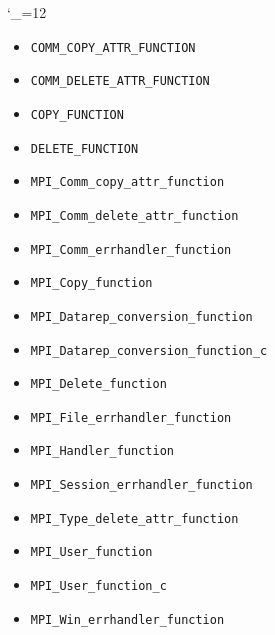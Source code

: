 \begin{multicols}{3}
\catcode`\_=12
\footnotesize
\begin{itemize}
\item \texttt{COMM_COPY_ATTR_FUNCTION}~\pageref{def:COMM_COPY_ATTR_FUNCTION}
\item \texttt{COMM_DELETE_ATTR_FUNCTION}~\pageref{def:COMM_DELETE_ATTR_FUNCTION}
\item \texttt{COPY_FUNCTION}~\pageref{def:COPY_FUNCTION}
\item \texttt{DELETE_FUNCTION}~\pageref{def:DELETE_FUNCTION}
\item \texttt{MPI_Comm_copy_attr_function}~\pageref{def:MPI_Comm_copy_attr_function}
\item \texttt{MPI_Comm_delete_attr_function}~\pageref{def:MPI_Comm_delete_attr_function}
\item \texttt{MPI_Comm_errhandler_function}~\pageref{def:MPI_Comm_errhandler_function}
\item \texttt{MPI_Copy_function}~\pageref{def:MPI_Copy_function}
\item \texttt{MPI_Datarep_conversion_function}~\pageref{def:MPI_Datarep_conversion_function}
\item \texttt{MPI_Datarep_conversion_function_c}~\pageref{def:MPI_Datarep_conversion_function_c}
\item \texttt{MPI_Delete_function}~\pageref{def:MPI_Delete_function}
\item \texttt{MPI_File_errhandler_function}~\pageref{def:MPI_File_errhandler_function}
\item \texttt{MPI_Handler_function}~\pageref{def:MPI_Handler_function}
\item \texttt{MPI_Session_errhandler_function}~\pageref{def:MPI_Session_errhandler_function}
\item \texttt{MPI_Type_delete_attr_function}~\pageref{def:MPI_Type_delete_attr_function}
\item \texttt{MPI_User_function}~\pageref{def:MPI_User_function}
\item \texttt{MPI_User_function_c}~\pageref{def:MPI_User_function_c}
\item \texttt{MPI_Win_errhandler_function}~\pageref{def:MPI_Win_errhandler_function}
\end{itemize}
\end{multicols}
